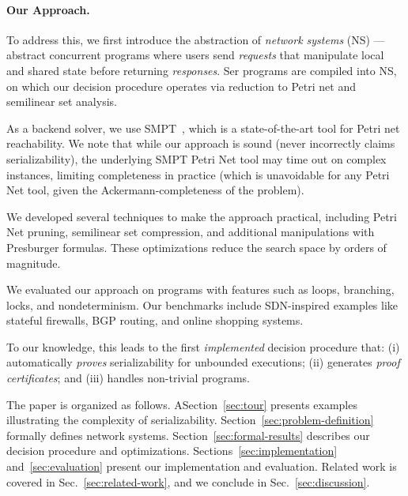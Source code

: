 \paragraph{Our Approach.}
To address this, we first introduce the abstraction of \textit{network systems} (NS) --- abstract concurrent programs where users send \textit{requests} that manipulate local and shared state before returning \textit{responses}. Ser programs are compiled into NS, on which our decision procedure operates via reduction to Petri net and semilinear set analysis.

As a backend solver, we use SMPT~\cite{AmDa23}, which is a state-of-the-art tool for Petri net reachability.
We note that while our approach is sound (never incorrectly claims serializability), the underlying SMPT Petri Net tool may time out on complex instances, limiting completeness in practice (which is unavoidable for any Petri Net tool, given the Ackermann-completeness of the problem).

We developed several techniques to make the approach practical, including Petri Net pruning, semilinear set compression, and additional manipulations with Presburger formulas.
These optimizations reduce the search space by orders of magnitude.

We evaluated our approach on programs with features such as loops, branching, locks, and nondeterminism. Our benchmarks include SDN-inspired examples like stateful firewalls, BGP routing, and online shopping systems.

To our knowledge, this leads to the first \emph{implemented} decision procedure that: (i) automatically \textit{proves} serializability for unbounded executions; (ii) generates \textit{proof certificates}; and (iii) handles non-trivial programs.


The paper is organized as follows. 
ASection~\ref{sec:tour} presents examples illustrating the complexity of serializability. Section~\ref{sec:problem-definition} formally defines network systems. Section~\ref{sec:formal-results} describes our decision procedure and optimizations. Sections~\ref{sec:implementation} and~\ref{sec:evaluation} present our implementation and evaluation. 
Related work is covered in Sec.~\ref{sec:related-work}, and we conclude in Sec.~\ref{sec:discussion}.
%


